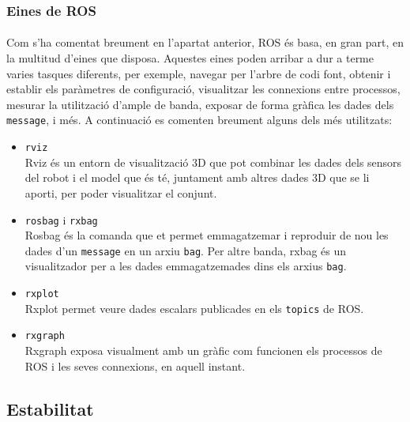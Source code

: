 \documentclass[12pt,a4paper,final,twoside]{article}
\begin{document}
\subsubsection{Eines de ROS}
\paragraph{}Com s'ha comentat breument en l'apartat anterior, ROS és basa, en gran part, en la multitud d'eines que disposa. Aquestes eines poden arribar a dur a terme varies tasques diferents, per exemple, navegar per l'arbre de codi font, obtenir i establir els paràmetres de configuració, visualitzar les connexions entre processos, mesurar la utilització d'ample de banda, exposar de forma gràfica les dades dels \texttt{message}, i més. A continuació es comenten breument alguns dels més utilitzats:
\begin{itemize}
\item \texttt{rviz}\\
Rviz és un entorn de visualització 3D que pot combinar les dades dels sensors del robot i el model que és té, juntament amb altres dades 3D que se li aporti, per poder visualitzar el conjunt.

\item \texttt{rosbag} i \texttt{rxbag}\\
Rosbag és la comanda que et permet emmagatzemar i reproduir de nou les dades d'un \texttt{message} en un arxiu \texttt{bag}. Per altre banda, rxbag és un visualitzador per a les dades emmagatzemades dins els arxius \texttt{bag}.

\item \texttt{rxplot}\\
Rxplot permet veure dades escalars publicades en els \texttt{topics} de ROS.

\item \texttt{rxgraph}\\
Rxgraph exposa visualment amb un gràfic com funcionen els processos de ROS i les seves connexions, en aquell instant.

\end{itemize}

\label{Estabilitat}
\subsection{Estabilitat}
\end{document}
